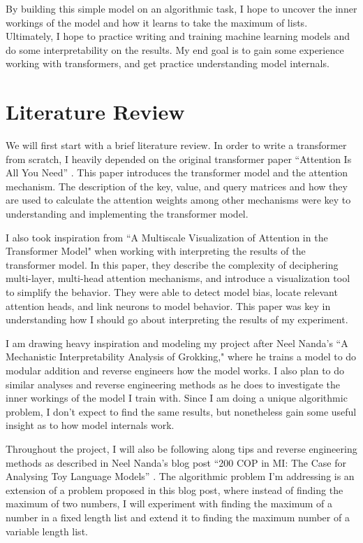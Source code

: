 \documentclass{article}
\begin{document}
By building this simple model on an algorithmic task, I hope to uncover the inner workings of the model and how it learns to take the maximum of lists. Ultimately, I hope to practice writing and training machine learning models and do some interpretability on the results. My end goal is to gain some experience working with transformers, and get practice understanding model internals. 

\section{Literature Review}

We will first start with a brief literature review. In order to write a transformer from scratch, I heavily depended on the original transformer paper ``Attention Is All You Need'' \cite{6}. This paper introduces the transformer model and the attention mechanism. The description of the key, value, and query matrices and how they are used to calculate the attention weights among other mechanisms were key to understanding and implementing the transformer model.

I also took inspiration from ``A Multiscale Visualization of Attention in the Transformer Model" \cite{7} when working with interpreting the results of the transformer model. In this paper, they describe the complexity of deciphering multi-layer, multi-head attention mechanisms, and introduce a visualization tool to simplify the behavior. They were able to detect model bias, locate relevant attention heads, and link neurons to model behavior. This paper was key in understanding how I should go about interpreting the results of my experiment.

I am drawing heavy inspiration and modeling my project after Neel Nanda's ``A Mechanistic Interpretability Analysis of Grokking,"\cite{2} where he trains a model to do modular addition and reverse engineers how the model works. I also plan to do similar analyses and reverse engineering methods as he does to investigate the inner workings of the model I train with. Since I am doing a unique algorithmic problem, I don't expect to find the same results, but nonetheless gain some useful insight as to how model internals work.

Throughout the project, I will also be following along tips and reverse engineering methods as described in Neel Nanda's blog post ``200 COP in MI: The Case for Analysing Toy Language Models'' \cite{3}. The algorithmic problem I'm addressing is an extension of a problem proposed in this blog post, where instead of finding the maximum of two numbers, I will experiment with finding the maximum of a number in a fixed length list and extend it to finding the maximum number of a variable length list. 
\end{document}
